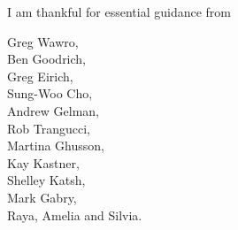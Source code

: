 \documentclass[oneside,12pt] {book}
\newcommand{\hsp}{\hspace{20pt}}
\begin{document}
\begin{acknowledgments}	
\setcounter{page}{2}
I am thankful for essential guidance from

{\singlespacing
Greg Wawro, \\
Ben Goodrich, \\
Greg Eirich, \\
Sung-Woo Cho, \\
Andrew Gelman, \\
Rob Trangucci, \\
Martina Ghusson, \\
Kay Kastner, \\
Shelley Katsh, \\
Mark Gabry, \\
Raya, Amelia and Silvia. \\   
}


\end{acknowledgments}

\clearpage

\setcounter{page}{3}
%
%



\begingroup
\titleformat{\chapter}[hang]{\Huge\bfseries}{\thechapter\hsp\textcolor{gray75}{|}\hsp}{0pt}{\Huge\bfseries}

{\singlespacing
\tableofcontents
}
\clearpage

\mainmatter










\endgroup


\begin{appendices}
\setcounter{subsection}{0}
\renewcommand\thefigure{\thesubsection.\arabic{figure}}    

\end{appendices}


\backmatter
\nocite{r_software}
\nocite{shinystan}

\begingroup
\titleformat{\chapter}[hang]{\Huge\bfseries}{\thechapter\hsp\textcolor{gray75}{|}\hsp}{0pt}{\Huge\bfseries}
    \setlength{}
    \raggedright
    
\endgroup
\end{document}

